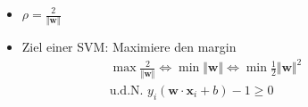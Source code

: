 \begin{frame}
\begin{figure}[h]
        \begin{itemize}
            \item $ \rho = \frac{2}{\Vert \boldsymbol{w} \Vert} $
            \item Ziel einer SVM: Maximiere den margin
                \begin{align*}
                    & \max \frac{2}{\Vert \boldsymbol{w} \Vert} \Leftrightarrow \min \Vert \boldsymbol{w} \Vert \Leftrightarrow \min \frac{1}{2} \Vert \boldsymbol{w} \Vert^2 \\
                    & \text{u.d.N. } y_i ( \boldsymbol{w} \cdot \boldsymbol{x}_i + b ) - 1 \geq 0 \\
                \end{align*}
        \end{itemize}
    \end{figure}
\end{frame}

